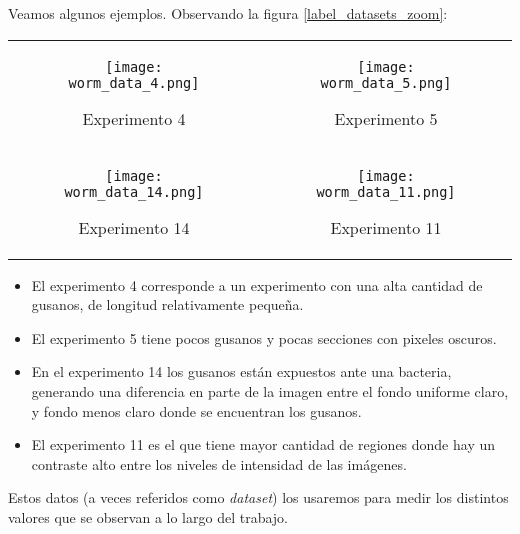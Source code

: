 \documentclass{article}
\begin{document}
Veamos algunos ejemplos. Observando la figura \ref{label_datasets_zoom}:

\begin{figure*}[h]
\begin{tabular}{cc}
\begin{subfigure}{0.45\textwidth}\centering\texttt{[image: worm\_data\_4.png]}\caption{Experimento 4}\label{label_four}\end{subfigure}&
\begin{subfigure}{0.45\textwidth}\centering\texttt{[image: worm\_data\_5.png]}\caption{Experimento 5}\label{label_five}\end{subfigure}\\
\newline
\begin{subfigure}{0.45\textwidth}\centering\texttt{[image: worm\_data\_14.png]}\caption{Experimento 14}\label{label_fourteen}\end{subfigure}&
\begin{subfigure}{0.45\textwidth}\centering\texttt{[image: worm\_data\_11.png]}\caption{Experimento 11}\label{label_eleven}\end{subfigure}\\
\end{tabular}
\caption{Ejemplos de experimentos}
\label{label_datasets_zoom}
\end{figure*}

\begin{itemize}
\item El experimento 4 corresponde a un experimento con una alta cantidad de gusanos, de longitud relativamente pequeña.

\item El experimento 5 tiene pocos gusanos y pocas secciones con pixeles oscuros.

\item En el experimento 14 los gusanos están expuestos ante una bacteria, generando una diferencia en parte de la imagen entre el fondo uniforme claro, y fondo menos claro donde se encuentran los gusanos.

\item El experimento 11 es el que tiene mayor cantidad de regiones donde hay un contraste alto entre los niveles de intensidad de las imágenes.
\end{itemize}
Estos datos (a veces referidos como \emph{dataset}) los usaremos para medir los distintos valores que se observan a lo largo del trabajo.
\end{document}
